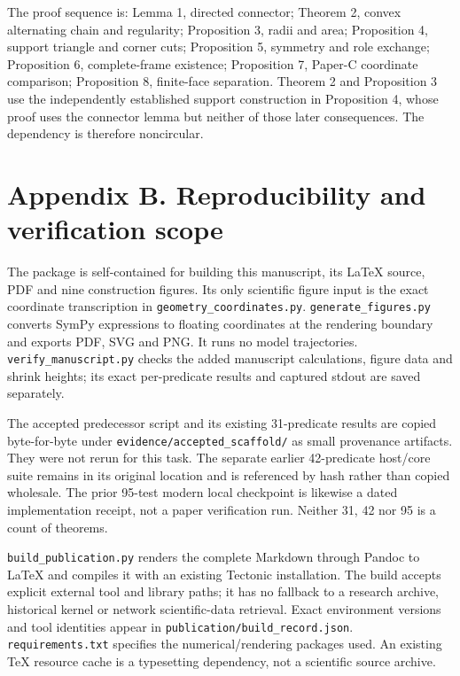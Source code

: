 \documentclass[
  11pt,
  a4paper,
]{article}
\begin{document}
The proof sequence is: Lemma 1, directed connector; Theorem 2, convex alternating chain and regularity; Proposition 3, radii and area; Proposition 4, support triangle and corner cuts; Proposition 5, symmetry and role exchange; Proposition 6, complete-frame existence; Proposition 7, Paper-C coordinate comparison; Proposition 8, finite-face separation. Theorem 2 and Proposition 3 use the independently established support construction in Proposition 4, whose proof uses the connector lemma but neither of those later consequences. The dependency is therefore noncircular.

\section{Appendix B. Reproducibility and verification scope}\label{appendix-b.-reproducibility-and-verification-scope}

The package is self-contained for building this manuscript, its LaTeX source, PDF and nine construction figures. Its only scientific figure input is the exact coordinate transcription in \texttt{geometry\_coordinates.py}. \texttt{generate\_figures.py} converts SymPy expressions to floating coordinates at the rendering boundary and exports PDF, SVG and PNG. It runs no model trajectories. \texttt{verify\_manuscript.py} checks the added manuscript calculations, figure data and shrink heights; its exact per-predicate results and captured stdout are saved separately.

The accepted predecessor script and its existing 31-predicate results are copied byte-for-byte under \texttt{evidence/accepted\_scaffold/} as small provenance artifacts. They were not rerun for this task. The separate earlier 42-predicate host/core suite remains in its original location and is referenced by hash rather than copied wholesale. The prior 95-test modern local checkpoint is likewise a dated implementation receipt, not a paper verification run. Neither 31, 42 nor 95 is a count of theorems.

\texttt{build\_publication.py} renders the complete Markdown through Pandoc to LaTeX and compiles it with an existing Tectonic installation. The build accepts explicit external tool and library paths; it has no fallback to a research archive, historical kernel or network scientific-data retrieval. Exact environment versions and tool identities appear in \texttt{publication/build\_record.json}. \texttt{requirements.txt} specifies the numerical/rendering packages used. An existing TeX resource cache is a typesetting dependency, not a scientific source archive.
\end{document}
